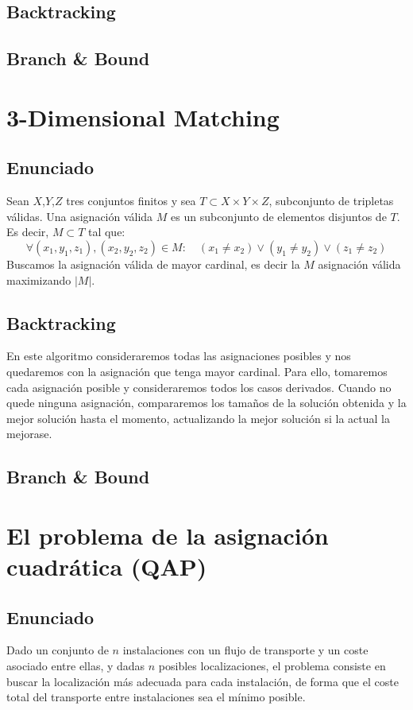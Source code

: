\documentclass[a4paper, 11pt]{article} %
\begin{document}
  
  \subsection{Backtracking}
  \subsection{Branch \& Bound}

\section{3-Dimensional Matching}
  \subsection{Enunciado}
    Sean $X$,$Y$,$Z$ tres conjuntos finitos y sea $T \subset X \times Y \times Z$, subconjunto de tripletas válidas.
    Una asignación válida $M$ es un subconjunto de elementos disjuntos de $T$. Es decir, $M \subset T$ tal que:
    \begin{equation}
     \forall (x_1,y_1,z_1), (x_2,y_2,z_2) \in M : \quad (x_1 \neq x_2) \vee (y_1 \neq y_2) \vee (z_1 \neq z_2)
    \end{equation} 
    Buscamos la asignación válida de mayor cardinal, es decir la $M$ asignación válida maximizando $|M|$.
    
  \subsection{Backtracking}
  En este algoritmo consideraremos todas las asignaciones posibles y nos quedaremos con la asignación que tenga mayor cardinal. Para ello, tomaremos cada asignación posible y consideraremos todos los casos derivados. Cuando no quede ninguna asignación, compararemos los tamaños de la solución obtenida y la mejor solución hasta el momento, actualizando la mejor solución si la actual la mejorase. 
  
  \subsection{Branch \& Bound}

\section{El problema de la asignación cuadrática (QAP)}
  \subsection{Enunciado}
    Dado un conjunto de $n$ instalaciones con un flujo de transporte y un coste asociado entre ellas, y dadas $n$ posibles 
    localizaciones, el problema consiste en buscar la localización más adecuada para cada instalación, de forma que el 
    coste total del transporte entre instalaciones sea el mínimo posible. 
\end{document}
